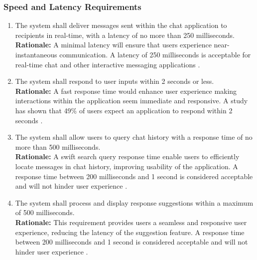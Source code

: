 \documentclass[]{article}
\begin{document}
\subsubsection{Speed and Latency Requirements}
\label{ssub:speed_and_latency_requirements}
\begin{enumerate}[{PR-SL}1. ]
    \item The system shall deliver messages sent within the chat application to recipients in real-time, with a latency
    of no more than 250 milliseconds. \\
    {\bf Rationale:} A minimal latency will ensure that users experience near-instantaneous communication.
    A latency of 250 milliseconds is acceptable for real-time chat and other interactive messaging applications
    \cite{3c}.
    \item The system shall respond to user inputs within 2 seconds or less. \\
    {\bf Rationale:} A fast response time would enhance user experience making interactions within the application 
    seem immediate and responsive. A study has shown that 49\% of users expect an application to respond within 2 seconds
    \cite{4c}.
    \item The system shall allow users to query chat history with a response time of no more than 500 milliseconds. \\
    {\bf Rationale:} A swift search query response time enable users to efficiently locate messages in chat history, improving 
    usability of the application. A response time between 200 milliseconds and 1 second is considered 
    acceptable and will not hinder user experience
    \cite{5c}. 
    \item The system shall process and display response suggestions within a maximum of 500 milliseconds. \\
    {\bf Rationale:} This requirement provides users a seamless and responsive user experience, reducing 
    the latency of the suggestion feature. A response time between 200 milliseconds and 1 second is considered 
    acceptable and will not hinder user experience 
    \cite{5c}. 
\end{enumerate}
\end{document}
